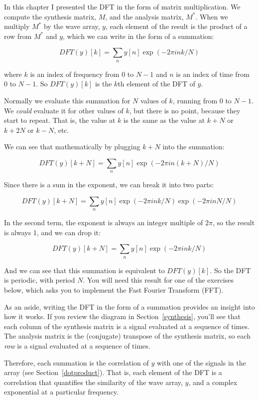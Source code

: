 \documentclass[12pt]{book} \usepackage[width=5.5in,height=8.5in, hmarginratio=3:2,vmarginratio=1:1]{geometry}
\begin{document}
In this chapter I presented the DFT in the form of matrix multiplication. We compute the synthesis matrix, $M$, and the analysis matrix, $M^*$. When we multiply $M^{*}$ by the wave array, $y$, each element of the result is the product of a row from $M^*$ and $y$, which we can write in the form of a summation: 

%
\[ DFT(y)[k] = \sum_n y[n] \exp(-2 \pi i n k / N) \] 

%
where $k$ is an index of frequency from $0$ to $N-1$ and $n$ is an index of time from $0$ to $N-1$. So $DFT(y)[k]$ is the $k$th element of the DFT of $y$. 

Normally we evaluate this summation for $N$ values of $k$, running from 0 to $N-1$. We {\em could} evaluate it for other values of $k$, but there is no point, because they start to repeat. That is, the value at $k$ is the same as the value at $k+N$ or $k+2N$ or $k-N$, etc. 

We can see that mathematically by plugging $k+N$ into the summation: 

%
\[ DFT(y)[k+N] = \sum_n y[n] \exp(-2 \pi i n (k+N) / N) \] 

%
Since there is a sum in the exponent, we can break it into two parts: 

%
\[ DFT(y)[k+N] = \sum_n y[n] \exp(-2 \pi i n k / N) \exp(-2 \pi i n N / N) \] 

%
In the second term, the exponent is always an integer multiple of $2 \pi$, so the result is always 1, and we can drop it: 

%
\[ DFT(y)[k+N] = \sum_n y[n] \exp(-2 \pi i n k / N) \] 

%
And we can see that this summation is equivalent to $ DFT(y)[k]$. So the DFT is periodic, with period $N$. You will need this result for one of the exercises below, which asks you to implement the Fast Fourier Transform (FFT). 

As an aside, writing the DFT in the form of a summation provides an insight into how it works. If you review the diagram in Section~\ref{synthesis}, you'll see that each column of the synthesis matrix is a signal evaluated at a sequence of times. The analysis matrix is the (conjugate) transpose of the synthesis matrix, so each {\em row} is a signal evaluated at a sequence of times. 

Therefore, each summation is the correlation of $y$ with one of the signals in the array (see Section~\ref{dotproduct}). That is, each element of the DFT is a correlation that quantifies the similarity of the wave array, $y$, and a complex exponential at a particular frequency. 
\end{document}
